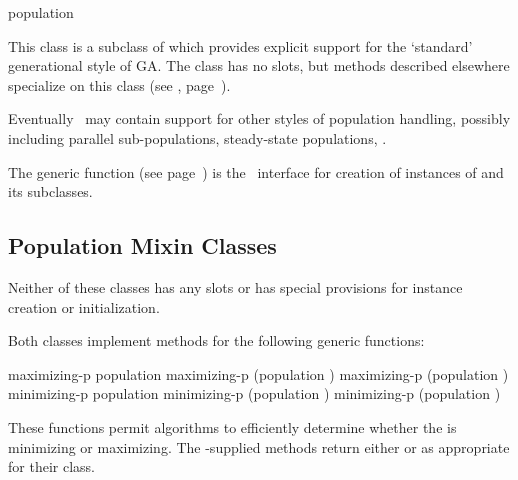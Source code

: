{{ {population}

This class is a subclass of  which provides explicit support
for the `standard' generational style of GA. The class has no
slots, but methods described elsewhere specialize on this class (see
, page~\pageref{method:regenerate}).
\par}%
\filbreak

Eventually \geco\ may contain support for other styles of population handling,
possibly including parallel sub-populations, steady-state populations, \etc.

\gap
\filbreak

{\samepage
{}

The generic function  (see
page~\pageref{method:make-population}) is the \geco\ interface for creation
of instances of  and its subclasses.
\par}%

\filbreak

{\samepage
\subsection{Population Mixin Classes}	\label{sec:population-mixin-classes}


Neither of these classes has any slots or has special provisions for
instance creation or initialization.
\par}%

\gap

\filbreak

{\samepage


Both classes implement methods for the following generic functions:

\Defgeneric maximizing-p {population}
 maximizing-p {(population )}
 maximizing-p {(population )}
\Defgeneric minimizing-p {population}
 minimizing-p {(population )}
 minimizing-p {(population )}

These functions permit algorithms to efficiently determine whether the
 is minimizing or maximizing.  The \geco-supplied methods
return either  or  as appropriate for their class.
\par}%

}
